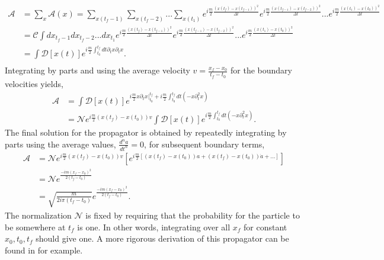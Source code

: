 \documentclass[12pt]{article}
\begin{document}
\begin{equation}
\begin{split}
\mathcal{A} &= \sum_{x} \mathcal{A}(x) = \sum_{x(t_f-1)} \sum_{x(t_f-2)} ... \sum_{x(t_1)} 
e^{i\frac{m}{2}\frac{(x(t_f) - x(t_{f-1}))^2}{\Delta t}}e^{i\frac{m}{2}\frac{(x(t_{f-1}) - x(t_{f-2}))^2}{\Delta t}}...
e^{i\frac{m}{2}\frac{(x(t_1) - x(t_{0}))^2}{\Delta t}} \\
&= \mathcal{C} \int dx_{t_f-1}dx_{t_f-2}...dx_{t_1} 
e^{i\frac{m}{2}\frac{(x(t_f) - x(t_{f-1}))^2}{\Delta t}}e^{i\frac{m}{2}\frac{(x(t_{f-1}) - x(t_{f-2}))^2}{\Delta t}}...
e^{i\frac{m}{2}\frac{(x(t_1) - x(t_{0}))^2}{\Delta t}}\\
& = \int \mathcal{D}[x(t)] e^{i\frac{m}{2}\int_{t_0}^{t_f} dt \partial_t x \partial_t x}.\\
\end{split}
\end{equation} 
Integrating by parts and using the average velocity $v = \frac{x_f-x_0}{t_f - t_0}$ for the boundary velocities yields,
\begin{equation}
\begin{split}
\mathcal{A} &= \int \mathcal{D}[x(t)] e^{i\frac{m}{2}x\partial_t x|^{t_f}_{t_0} + i\frac{m}{2}\int_{t_0}^{t_f} dt (-x \partial^2_t x)} \\ 
            &= \mathcal{N}e^{i\frac{m}{2}(x(t_f) - x(t_0))v}\int \mathcal{D}[x(t)] e^{i\frac{m}{2}\int_{t_0}^{t_f} dt (-x \partial^2_t x)}.
\end{split}
\end{equation}
The final solution for the propagator is obtained by repeatedly integrating by parts using the average values, $\frac{d^na}{dt^n}=0$, for subsequent boundary terms,
\begin{equation}
\begin{split}
\mathcal{A} &= \mathcal{N}e^{i\frac{m}{2}(x(t_f) - x(t_0))v}\left[e^{i\frac{m}{2}[(x(t_f) - x(t_0))a + (x(t_f) - x(t_0))\dot{a} + ...]}\right] \\ 
            &= \mathcal{N}e^{\frac{-im(x_f - x_0)^2}{2(t_f - t_0)}} \\
            &= \sqrt{\frac{m}{2i\pi(t_f-t_0)}}e^{\frac{-im(x_f - x_0)^2}{2(t_f - t_0)}}.
\end{split}
\end{equation}
The normalization $\mathcal{N}$ is fixed by requiring that the probability for the particle to be somewhere at $t_f$ is one. In other words, integrating over all $x_f$ for constant $x_0, t_0, t_f$ should give one. A more rigorous derivation of this propagator can be found in \cite{feynhibbs} for example.
\end{document}
